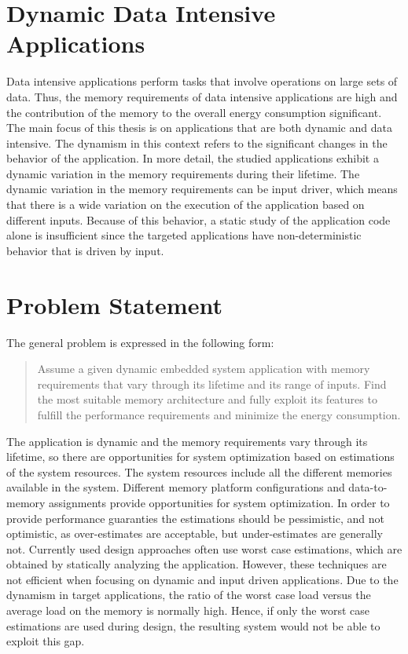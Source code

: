 \section{Dynamic Data Intensive Applications}

Data intensive applications perform tasks that involve operations on large sets of data.
Thus, the memory requirements of data intensive applications are high and the contribution of the memory to the overall energy consumption significant.
The main focus of this thesis is on applications that are both dynamic and data intensive.
The dynamism in this context refers to the significant changes in the behavior of the application.
In more detail, the studied applications exhibit a dynamic variation in the memory requirements during their lifetime.
The dynamic variation in the memory requirements can be input driver, which means that there is a wide variation on the execution of the application based on different inputs.
Because of this behavior, a static study of the application code alone is insufficient since the targeted applications have non-deterministic behavior that is driven by input.

\section{Problem Statement}
\label{sec:problem}

The general problem is expressed in the following form:
\begin{quote}
Assume a given dynamic embedded system application with memory requirements that vary through its lifetime and its range of inputs. Find the most suitable memory architecture and fully exploit its features to fulfill the performance requirements and minimize the energy consumption. 
\end{quote} 

The application is dynamic and the memory requirements vary through its lifetime, so there are opportunities for system optimization based on estimations of the system resources.
The system resources include all the different memories available in the system.
Different memory platform configurations and data-to-memory assignments provide opportunities for system optimization.
In order to provide performance guaranties the estimations should be pessimistic, and not optimistic, as over-estimates are acceptable, but under-estimates are generally not.
Currently used design approaches often use worst case estimations, which are obtained by statically analyzing the application. 
However, these techniques are not efficient when focusing on dynamic and input driven applications.
Due to the dynamism in target applications, the ratio of the worst case load versus the average load on the memory is normally high.
Hence, if only the worst case estimations are used during design, the resulting system would not be able to exploit this gap. 

